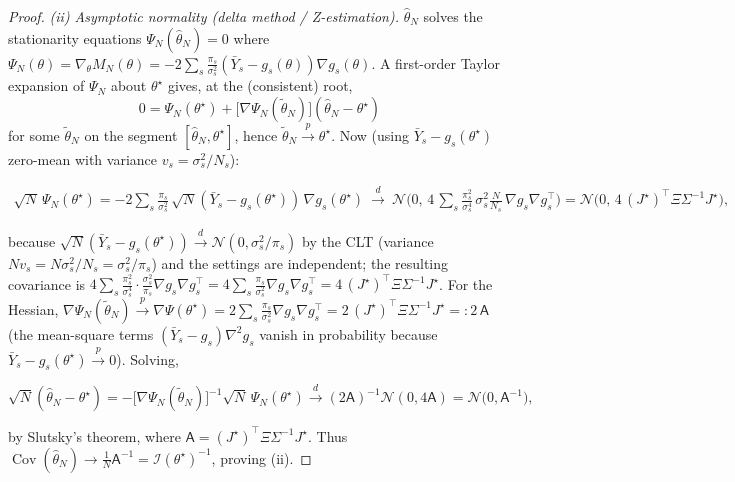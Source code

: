 \documentclass[aps,prxquantum,reprint,superscriptaddress,nofootinbib,amsmath,amssymb]{revtex4-2}
\begin{document}
\begin{proof}
\emph{(ii) Asymptotic normality (delta method / Z-estimation).} $\hat\theta_N$ solves the stationarity equations $\Psi_N(\hat\theta_N)=0$ where $\Psi_N(\theta)=\nabla_\theta M_N(\theta)=-2\sum_s\tfrac{\pi_s}{\sigma_s^2}(\bar Y_s-g_s(\theta))\nabla g_s(\theta)$. A first-order Taylor expansion of $\Psi_N$ about $\theta^\star$ gives, at the (consistent) root,
\begin{equation*}
    0=\Psi_N(\theta^\star)+\bigl[\nabla\Psi_N(\tilde\theta_N)\bigr](\hat\theta_N-\theta^\star)
\end{equation*}
for some $\tilde\theta_N$ on the segment $[\hat\theta_N,\theta^\star]$, hence $\tilde\theta_N\xrightarrow{p}\theta^\star$. Now (using $\bar Y_s-g_s(\theta^\star)$ zero-mean with variance $v_s=\sigma_s^2/N_s$):
\begin{widetext}
\begin{align*}
    \sqrt N\,\Psi_N(\theta^\star)
    =-2\sum_s\frac{\pi_s}{\sigma_s^2}\,\sqrt N(\bar Y_s-g_s(\theta^\star))\,\nabla g_s(\theta^\star)
    \ \xrightarrow{\ d\ }\ \mathcal{N}\!\bigl(0,\,4\,\textstyle\sum_s\tfrac{\pi_s^2}{\sigma_s^4}\,\sigma_s^2\tfrac{N}{N_s}\,\nabla g_s\nabla g_s^\top\bigr)
    =\mathcal{N}\!\bigl(0,\,4\,(J^\star)^\top\Xi\Sigma^{-1}J^\star\bigr),
\end{align*}
\end{widetext}
because $\sqrt N(\bar Y_s-g_s(\theta^\star))\xrightarrow{d}\mathcal{N}(0,\sigma_s^2/\pi_s)$ by the CLT (variance $N v_s=N\sigma_s^2/N_s=\sigma_s^2/\pi_s$) and the settings are independent; the resulting covariance is $4\sum_s\tfrac{\pi_s^2}{\sigma_s^4}\cdot\tfrac{\sigma_s^2}{\pi_s}\nabla g_s\nabla g_s^\top=4\sum_s\tfrac{\pi_s}{\sigma_s^2}\nabla g_s\nabla g_s^\top=4\,(J^\star)^\top\Xi\Sigma^{-1}J^\star$. For the Hessian, $\nabla\Psi_N(\tilde\theta_N)\xrightarrow{p}\nabla\Psi(\theta^\star)=2\sum_s\tfrac{\pi_s}{\sigma_s^2}\nabla g_s\nabla g_s^\top=2\,(J^\star)^\top\Xi\Sigma^{-1}J^\star=:2\,\mathsf{A}$ (the mean-square terms $(\bar Y_s-g_s)\nabla^2g_s$ vanish in probability because $\bar Y_s-g_s(\theta^\star)\xrightarrow{p}0$). Solving,
\begin{widetext}
\begin{equation*}
    \sqrt N(\hat\theta_N-\theta^\star)=-\bigl[\nabla\Psi_N(\tilde\theta_N)\bigr]^{-1}\sqrt N\,\Psi_N(\theta^\star)\xrightarrow{\ d\ }(2\mathsf{A})^{-1}\mathcal{N}(0,4\mathsf{A})=\mathcal{N}\!\bigl(0,\mathsf{A}^{-1}\bigr),
\end{equation*}
\end{widetext}
by Slutsky's theorem, where $\mathsf{A}=(J^\star)^\top\Xi\Sigma^{-1}J^\star$. Thus $\operatorname{Cov}(\hat\theta_N)\to\tfrac1N\mathsf{A}^{-1}=\mathcal{I}(\theta^\star)^{-1}$, proving (ii).


\end{proof}
\end{document}
